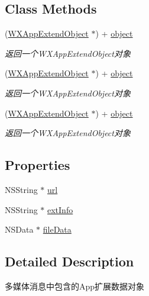 \subsection*{Class Methods}
\begin{DoxyCompactItemize}
\item 
(\mbox{\hyperlink{interface_w_x_app_extend_object}{W\+X\+App\+Extend\+Object}} $\ast$) + \mbox{\hyperlink{interface_w_x_app_extend_object_af81c54295af4cf412d71ec98d462fc84}{object}}
\begin{DoxyCompactList}\small\item\em 返回一个\+W\+X\+App\+Extend\+Object对象 \end{DoxyCompactList}\item 
(\mbox{\hyperlink{interface_w_x_app_extend_object}{W\+X\+App\+Extend\+Object}} $\ast$) + \mbox{\hyperlink{interface_w_x_app_extend_object_af81c54295af4cf412d71ec98d462fc84}{object}}
\begin{DoxyCompactList}\small\item\em 返回一个\+W\+X\+App\+Extend\+Object对象 \end{DoxyCompactList}\item 
(\mbox{\hyperlink{interface_w_x_app_extend_object}{W\+X\+App\+Extend\+Object}} $\ast$) + \mbox{\hyperlink{interface_w_x_app_extend_object_af81c54295af4cf412d71ec98d462fc84}{object}}
\begin{DoxyCompactList}\small\item\em 返回一个\+W\+X\+App\+Extend\+Object对象 \end{DoxyCompactList}\end{DoxyCompactItemize}
\subsection*{Properties}
\begin{DoxyCompactItemize}
\item 
N\+S\+String $\ast$ \mbox{\hyperlink{interface_w_x_app_extend_object_aa83bdc98798add8efc102fdc45f28964}{url}}
\item 
N\+S\+String $\ast$ \mbox{\hyperlink{interface_w_x_app_extend_object_a0136894200a2a9f93f75f9a9d0455c9d}{ext\+Info}}
\item 
N\+S\+Data $\ast$ \mbox{\hyperlink{interface_w_x_app_extend_object_ac26de1f04438a0d0b42fc0f5cca7ad06}{file\+Data}}
\end{DoxyCompactItemize}


\subsection{Detailed Description}
多媒体消息中包含的\+App扩展数据对象 

